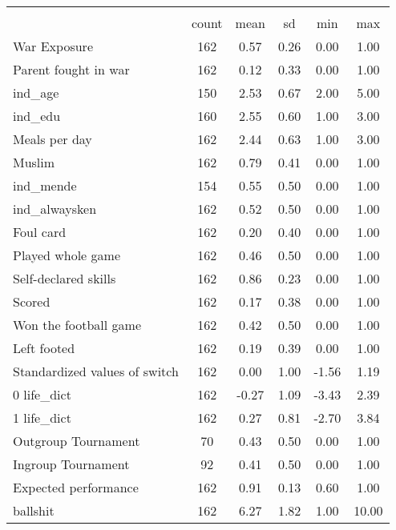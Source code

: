 {
\def\sym#1{\ifmmode^{#1}\else\(^{#1}\)\fi}
\begin{tabular}{l*{1}{ccccc}}
\hline\hline
                    &\multicolumn{5}{c}{}                                            \\
                    &       count&        mean&          sd&         min&         max\\
\hline
War Exposure        &         162&        0.57&        0.26&        0.00&        1.00\\
Parent fought in war&         162&        0.12&        0.33&        0.00&        1.00\\
ind\_age             &         150&        2.53&        0.67&        2.00&        5.00\\
ind\_edu             &         160&        2.55&        0.60&        1.00&        3.00\\
Meals per day       &         162&        2.44&        0.63&        1.00&        3.00\\
Muslim              &         162&        0.79&        0.41&        0.00&        1.00\\
ind\_mende           &         154&        0.55&        0.50&        0.00&        1.00\\
ind\_alwaysken       &         162&        0.52&        0.50&        0.00&        1.00\\
Foul card           &         162&        0.20&        0.40&        0.00&        1.00\\
Played whole game   &         162&        0.46&        0.50&        0.00&        1.00\\
Self-declared skills&         162&        0.86&        0.23&        0.00&        1.00\\
Scored              &         162&        0.17&        0.38&        0.00&        1.00\\
Won the football game&         162&        0.42&        0.50&        0.00&        1.00\\
Left footed         &         162&        0.19&        0.39&        0.00&        1.00\\
Standardized values of switch&         162&        0.00&        1.00&       -1.56&        1.19\\
0 life\_dict         &         162&       -0.27&        1.09&       -3.43&        2.39\\
1 life\_dict         &         162&        0.27&        0.81&       -2.70&        3.84\\
Outgroup Tournament &          70&        0.43&        0.50&        0.00&        1.00\\
Ingroup Tournament  &          92&        0.41&        0.50&        0.00&        1.00\\
Expected performance&         162&        0.91&        0.13&        0.60&        1.00\\
ballshit            &         162&        6.27&        1.82&        1.00&       10.00\\
\hline\hline
\end{tabular}
}
